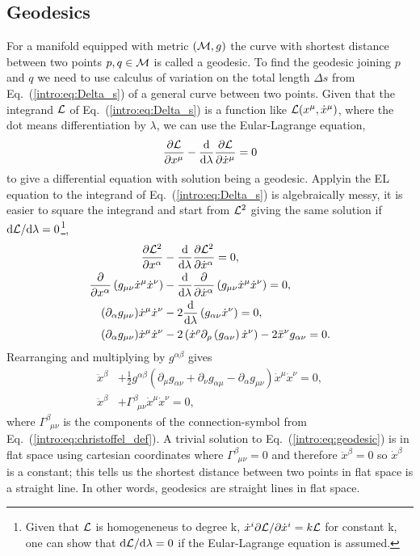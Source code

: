  \subsection{Geodesics}
 For a manifold equipped with metric $(\mathcal{M},g)$ the curve with shortest distance between two points $p,q\in\mathcal{M}$ is called a geodesic. To find the geodesic joining $p$ and $q$ we need to use calculus of variation on the total length $\Delta s$ from Eq.~(\ref{intro:eq:Delta_s}) of a general curve between two points. Given that the integrand $\mathcal{L}$ of Eq.~(\ref{intro:eq:Delta_s}) is a function like $\mathcal{L}(x^\mu,\dot{x}^\mu)$, where the dot means differentiation by $\lambda$, we can use the Eular-Lagrange equation,
\begin{align}
\frac{\partial{\mathcal{L}}}{\partial x^\mu} - \frac{\dd}{\dd \lambda}\frac{\partial \mathcal{L}}{\partial \dot{x}^\mu} = 0
\end{align}
to give a differential equation with solution being a geodesic. Applyin the EL equation to the integrand of Eq.~(\ref{intro:eq:Delta_s}) is algebraically messy, it is easier to square the integrand and start from $\mathcal{L}^2$ giving the same solution if $\dd \mathcal{L} / \dd \lambda=0$\footnote{Given that $\mathcal{L}$ is homogeneneus to degree k, $\dot{x}^i \partial \mathcal{L} / \partial \dot{x}^i = k\mathcal{L}$ for constant k, one can show that $\dd\mathcal{L}/\dd\lambda=0$ if the Eular-Lagrange equation is assumed.}, 
\begin{align}
\frac{\partial{\mathcal{L}^2}}{\partial x^\alpha} &- \frac{\dd}{\dd \lambda}\frac{\partial \mathcal{L}^2}{\partial \dot{x}^\alpha} = 0, \\
\frac{\partial}{\partial x^\alpha} \left(g_{\mu\nu}\dot{x}^\mu\dot{x}^\nu\right) &- \frac{\dd}{\dd \lambda}\frac{\partial }{\partial \dot{x}^\alpha}\left(g_{\mu\nu}\dot{x}^\mu\dot{x}^\nu\right) = 0, \\
(\partial_\alpha g_{\mu\nu})\dot{x}^\mu\dot{x}^\nu &- 2\frac{\dd}{\dd \lambda}\left(g_{\alpha\nu}\dot{x}^\nu\right) = 0, \\
(\partial_\alpha g_{\mu\nu})\dot{x}^\mu\dot{x}^\nu &- 2\left(\dot{x}^\rho \partial_\rho \left(g_{\alpha\nu}\right)\dot{x}^\nu\right) - 2\ddot{x}^\nu g_{\alpha\nu} =0. 
\end{align}
Rearranging and multiplying by $g^{\alpha\beta}$ gives
\begin{align}
\ddot{x}^\beta &+ \frac{1}{2}g^{\alpha\beta}\left(\partial_{\mu}g_{\alpha\nu} +\partial_{\nu}g_{\alpha\mu} -\partial_{\alpha}g_{\mu\nu} \right)\dot{x}^\mu\dot{x}^\nu=0,\\
 \label{intro:eq:geodesic}\ddot{x}^\beta &+ \Gamma^\beta_{\,\,\,\mu\nu}\dot{x}^\mu\dot{x}^\nu=0,
\end{align}
where $\Gamma^\beta_{\,\,\,\mu\nu}$ is the components of the connection-symbol from Eq.~(\ref{intro:eq:christoffel_def}). A trivial solution to Eq.~(\ref{intro:eq:geodesic}) is in flat space using cartesian coordinates where $\Gamma^\beta_{\,\,\,\mu\nu}=0$ and therefore $\ddot{x}^\beta=0$ so $\dot{x}^\beta$ is a constant; this tells us the shortest distance between two points in flat space is a straight line. In other words, geodesics are straight lines in flat space.


